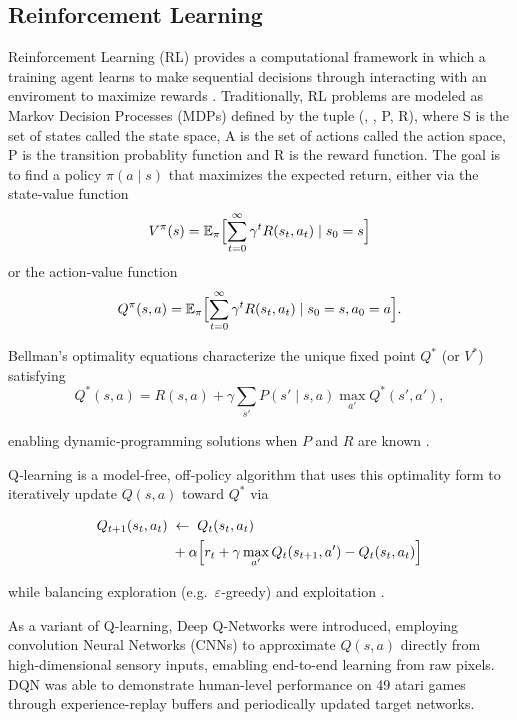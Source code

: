 \subsection{Reinforcement Learning}

Reinforcement Learning (RL) provides a computational framework in which a training agent learns to make sequential decisions through interacting with an enviroment to maximize rewards \cite{mnih2013playingatarideepreinforcement}.
Traditionally, RL problems are modeled as Markov Decision Processes (MDPs) defined by the tuple (, , P, R), where S is the set of states called the state space, A is the set of actions called the action space, P is the transition probablity function and R is the reward function\cite{Sutton1998}.
The goal is to find a policy \(\pi(a\!\mid\!s)\) that maximizes the expected return, either via the state‑value function
\begin{equation}
V^\pi(s) = \mathbb{E}_\pi\Bigl[\sum_{t=0}^\infty \gamma^t R(s_t,a_t)\mid s_0 = s\Bigr]
\end{equation}
or the action‑value function
\begin{equation}
Q^\pi(s,a) = \mathbb{E}_\pi\Bigl[\sum_{t=0}^\infty \gamma^t R(s_t,a_t)\mid s_0 = s,a_0 = a\Bigr].
\end{equation}

Bellman’s optimality equations characterize the unique fixed point \(Q^*\) (or \(V^*\)) satisfying
\begin{equation}
Q^*(s,a) = R(s,a) + \gamma \sum_{s'} P(s'\!\mid\!s,a)\max_{a'} Q^*(s',a'),
\end{equation}

enabling dynamic‑programming solutions when \(P\) and \(R\) are known \cite{bellman1962applied}.

Q‑learning is a model‑free, off‑policy algorithm that uses this optimality form to iteratively update \(Q(s,a)\) toward \(Q^*\) via

\begin{align}
Q_{t+1}(s_t,a_t)\;&\leftarrow\;Q_t(s_t,a_t)\\
&+ \alpha\Bigl[r_t + \gamma \max_{a'}Q_t(s_{t+1},a') - Q_t(s_t,a_t)\Bigr]
\end{align}

while balancing exploration (e.g.\ \(\varepsilon\)‑greedy) and exploitation \cite{watkins1992q}.  

As a variant of Q-learning, Deep Q-Networks\cite{mnih2013playingatarideepreinforcement} were introduced, employing convolution Neural Networks (CNNs) to approximate \(Q(s,a)\) directly from high-dimensional sensory inputs, emabling end-to-end learning from raw pixels.
DQN was able to demonstrate human-level performance on 49 atari games through experience-replay buffers and periodically updated target networks\cite{mnih2015humanlevel}.

